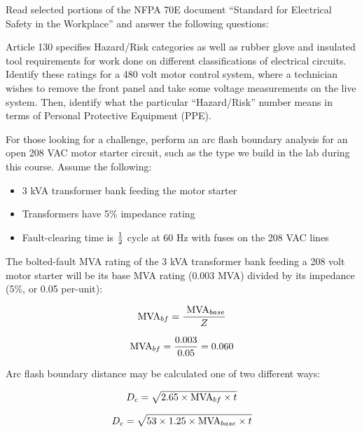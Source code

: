 

Read selected portions of the NFPA 70E document ``Standard for Electrical Safety in the Workplace'' and answer the following questions:

\vskip 10pt

Article 130 specifies Hazard/Risk categories as well as rubber glove and insulated tool requirements for work done on different classifications of electrical circuits.  Identify these ratings for a 480 volt motor control system, where a technician wishes to remove the front panel and take some voltage measurements on the live system.  Then, identify what the particular ``Hazard/Risk'' number means in terms of Personal Protective Equipment (PPE).

\vskip 30pt

For those looking for a challenge, perform an arc flash boundary analysis for an open 208 VAC motor starter circuit, such as the type we build in the lab during this course.  Assume the following:

\begin{itemize}
\item{} 3 kVA transformer bank feeding the motor starter
\item{} Transformers have 5\% impedance rating
\item{} Fault-clearing time is $1 \over 2$ cycle at 60 Hz with fuses on the 208 VAC lines
\end{itemize}








The bolted-fault MVA rating of the 3 kVA transformer bank feeding a 208 volt motor starter will be its base MVA rating (0.003 MVA) divided by its impedance (5\%, or 0.05 per-unit):

$$\hbox{MVA}_{bf} = {\hbox{ MVA}_{base} \over Z}$$

$$\hbox{MVA}_{bf} = {0.003 \over 0.05} = 0.060$$

Arc flash boundary distance may be calculated one of two different ways:

$$D_c = \sqrt{2.65 \times \hbox{MVA}_{bf} \times t}$$
 
$$D_c = \sqrt{53 \times 1.25 \times \hbox{MVA}_{base} \times t}$$

